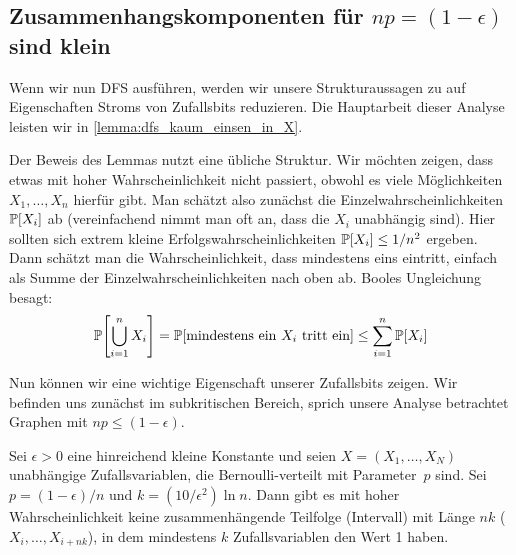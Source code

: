 \subsection{Zusammenhangskomponenten für $np = (1-\epsilon)$ sind klein}
Wenn wir nun DFS ausführen, werden wir unsere Strukturaussagen zu \Gnp auf Eigenschaften Stroms von Zufallsbits reduzieren.
Die Hauptarbeit dieser Analyse leisten wir in \cref{lemma:dfs_kaum_einsen_in_X}.

Der  Beweis des Lemmas nutzt eine übliche Struktur.
Wir möchten zeigen, dass etwas mit hoher Wahrscheinlichkeit nicht passiert, obwohl es viele Möglichkeiten $X_1, \ldots, X_n$ hierfür gibt.
Man schätzt also zunächst die Einzelwahrscheinlichkeiten~$\mathbb{P}\!\left[X_i\right]$ ab (vereinfachend nimmt man oft an, dass die $X_i$ unabhängig sind).
Hier sollten sich extrem kleine Erfolgswahrscheinlichkeiten $\mathbb{P}\!\left[X_i\right] \le 1/n^2$ ergeben.
Dann schätzt man die Wahrscheinlichkeit, dass mindestens eins eintritt, einfach als Summe der Einzelwahrscheinlichkeiten nach oben ab.
Booles  Ungleichung besagt:
\begin{equation}
    \mathbb{P}\!\left[\bigcup_{i=1}^n X_i\right] = \mathbb{P}\!\left[\text{mindestens ein $X_i$ tritt ein}\right] \le \sum_{i=1}^n \mathbb{P}\!\left[X_i\right]
\end{equation}

\noindent
Nun können wir eine wichtige Eigenschaft unserer Zufallsbits zeigen.
Wir befinden uns zunächst im subkritischen Bereich, sprich unsere Analyse betrachtet Graphen mit $np \le (1 - \epsilon)$.

\begin{lemma}\label{lemma:dfs_kaum_einsen_in_X}
    Sei $\epsilon > 0$  eine hinreichend kleine Konstante und seien $X = (X_1, \ldots, X_N)$ unabhängige Zufallsvariablen, die Bernoulli-verteilt mit Parameter~$p$ sind.
    Sei $p = (1 - \epsilon) / n$ und $k = (10 / \epsilon^2) \ln n$.
    Dann gibt es mit hoher Wahrscheinlichkeit keine zusammenhängende Teilfolge (Intervall) mit Länge $nk$ (\dh $X_i, \ldots, X_{i+nk}$), in dem mindestens $k$ Zufallsvariablen den Wert 1 haben.
\end{lemma}

